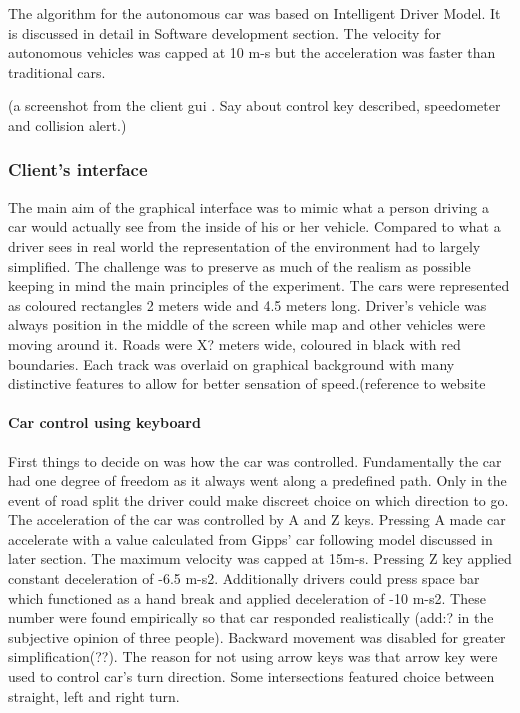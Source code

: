 \documentclass[11pt,english]{article}
\begin{document}
The algorithm for the autonomous car was based on Intelligent Driver Model. It is discussed in detail in Software development section. The velocity for autonomous vehicles was capped at 10 m-s but the acceleration was faster than traditional cars.  



(a screenshot from the client gui . Say about control key described, speedometer and collision alert.)



\subsubsection{Client's interface}

The main aim of the graphical interface was to mimic what a person driving a car would actually see from the inside of his or her vehicle. Compared to what a driver sees in real world the representation of the environment had to largely simplified. The challenge was to preserve as much of the realism as possible keeping in mind the main principles of the experiment. The cars were represented as coloured rectangles 2 meters wide and 4.5 meters long. Driver's vehicle was always position in the middle of the screen while map and other vehicles were moving around it. Roads were X? meters wide, coloured in black with red boundaries. Each track was overlaid on graphical background with many distinctive features to allow for better sensation of speed.(reference to website %


\paragraph{Car control using keyboard}
First things to decide on was how the car was controlled.
Fundamentally the car had one degree of freedom as it always went along a predefined path. Only in the event of road split the driver could make discreet choice on which direction to go.
The acceleration of the car was controlled by A and Z keys. Pressing A made car accelerate with a value calculated from Gipps' car following model discussed in later section. The maximum velocity was capped at 15m-s. Pressing Z key applied constant deceleration of -6.5 m-s2. Additionally drivers could press space bar which functioned as a hand break and applied deceleration of -10 m-s2. These number were found empirically so that car responded realistically (add:? in the subjective opinion of three people). Backward movement was disabled for greater simplification(??).
The reason for not using arrow keys was that arrow key were used to control car's turn direction. Some intersections featured choice between straight, left and right turn. 
\end{document}
